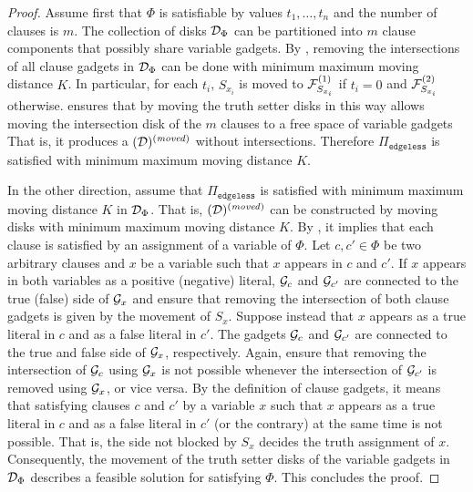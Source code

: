 \begin{toappendix}
\begin{toappendix}
\begin{proof}
    Assume first that $\Phi$ is satisfiable by values $t_1,\ldots,t_n$ and the number of clauses is $m$.
    The collection of disks $\mathcal{D}_\Phi$ can be partitioned into $m$ clause components that possibly share variable gadgets.
    By , removing the intersections of all clause gadgets in $\mathcal{D}_\Phi$ can be done with minimum maximum moving distance $K$.
    In particular, for each $t_i$, $S_{x_i}$ is moved to $\mathcal{F}_{S_{x_i}}^{(1)}$ if $t_i = 0$ and $\mathcal{F}_{S_{x_i}}^{(2)}$ otherwise.
     ensures that by moving the truth setter disks in this way allows moving the intersection disk of the $m$ clauses to a free space of variable gadgets
    That is, it produces a $(\mathcal{D})^{(\mathit{moved})}$ without intersections.
    Therefore $\Pi_{\texttt{edgeless}}$ is satisfied with minimum maximum moving distance $K$.

    In the other direction, assume that $\Pi_{\texttt{edgeless}}$ is satisfied with minimum maximum moving distance $K$ in $\mathcal{D}_\Phi$.
    That is, $(\mathcal{D})^{(\mathit{moved})}$ can be constructed by moving disks with minimum maximum moving distance $K$.
    By , it implies that each clause is satisfied by an assignment of a variable of $\Phi$.
    Let $c,c' \in \Phi$ be two arbitrary clauses and $x$ be a variable such that $x$ appears in $c$ and $c'$.
    If $x$ appears in both variables as a positive (negative) literal, $\mathcal{G}_c$ and $\mathcal{G}_{c'}$ are connected to the true (false) side of $\mathcal{G}_{x}$ and  ensure that removing the intersection of both clause gadgets is given by the movement of $S_x$.
    Suppose instead that $x$ appears as a true literal in $c$ and as a false literal in $c'$.
    The gadgets $\mathcal{G}_c$ and $\mathcal{G}_{c'}$ are connected to the true and false side of $\mathcal{G}_x$, respectively.
    Again,  ensure that removing the intersection of $\mathcal{G}_{c}$ using $\mathcal{G}_x$ is not possible whenever the intersection of $\mathcal{G}_{c'}$ is removed using $\mathcal{G}_{x}$, or vice versa.
    By the definition of clause gadgets, it means that satisfying clauses $c$ and $c'$ by a variable $x$ such that $x$ appears as a true literal in $c$ and as a false literal in $c'$ (or the contrary) at the same time is not possible.
    That is, the side not blocked by $S_x$ decides the truth assignment of $x$.
    Consequently, the movement of the truth setter disks of the variable gadgets in $\mathcal{D}_\Phi$ describes a feasible solution for satisfying $\Phi$.
    This concludes the proof.
\end{proof}


\end{toappendix}
\end{toappendix}
